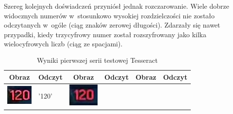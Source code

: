 Szereg kolejnych doświadczeń przyniósł jednak rozczarowanie. 
Wiele dobrze widocznych numerów w~stosunkowo wysokiej rozdzielczości 
nie zostało odczytanych w~ogóle (ciąg znaków zerowej długości). Zdarzały 
się nawet przypadki, kiedy trzycyfrowy numer został rozszyfrowany jako
kilka wielocyfrowych liczb (ciąg ze spacjami).

\begin{table}[h!]
  \centering
  \caption{Wyniki pierwszej serii testowej Tesseract}\label{tbl:tess_01}
  \begin{tabular}{| c | l | c | l | c | l |}
  	\hline
    Obraz & Odczyt & Obraz & Odczyt & Obraz & Odczyt  \\ 
    \hline
    \begin{minipage}{.2\textwidth}
      \includegraphics[width=\textwidth]{img/exp_number_02}
    \end{minipage}
    &
    '120'
    &
    \begin{minipage}{.2\textwidth}
      \includegraphics[width=\textwidth]{img/exp_number_03}

\end{minipage}
\end{tabular}
\end{table}
